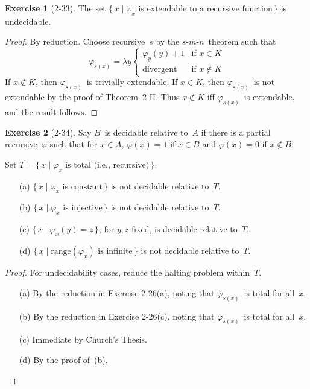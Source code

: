 \documentclass[letterpaper]{article}
\newcommand{\ran}{\mathrm{range}}
\newcommand{\smn}{$s$-$m$-$n$}
\theoremstyle{definition}
\newtheorem*{exer}{Exercise}
\theoremstyle{remark}
\theoremstyle{direction}
\begin{document}
\begin{exer}[2-33]
The set $\{\,x\mid\varphi_x\text{ is extendable to a recursive function}\,\}$ is undecidable.
\end{exer}
\begin{proof}
By reduction. Choose recursive~$s$ by the \smn\ theorem such that
$$\varphi_{s(x)}=\lambda y\begin{cases}
\varphi_y(y)+1&\text{if }x\in K\\
\text{divergent}&\text{if }x\not\in K
\end{cases}$$
If $x\not\in K$, then $\varphi_{s(x)}$~is trivially extendable. If $x\in K$, then $\varphi_{s(x)}$~is not extendable by the proof of Theorem~2-II. Thus $x\not\in K$ iff $\varphi_{s(x)}$~is extendable, and the result follows.
\end{proof}

\begin{exer}[2-34]
Say $B$~is decidable relative to~$A$ if there is a partial recursive~$\varphi$ such that for $x\in A$, $\varphi(x)=1$ if $x\in B$ and $\varphi(x)=0$ if $x\not\in B$.

Set $T=\{\,x\mid\varphi_x\text{ is total (i.e., recursive)}\,\}$.
\begin{enumerate}[itemsep=0pt]
\item[(a)] $\{\,x\mid\varphi_x\text{ is constant}\,\}$ is not decidable relative to~$T$.
\item[(b)] $\{\,x\mid\varphi_x\text{ is injective}\,\}$ is not decidable relative to~$T$.
\item[(c)] $\{\,x\mid\varphi_x(y)=z\,\}$, for $y,z$ fixed, is decidable relative to~$T$.
\item[(d)] $\{\,x\mid\ran(\varphi_x)\text{ is infinite}\,\}$ is not decidable relative to~$T$.
\end{enumerate}
\end{exer}
\begin{proof}
For undecidability cases, reduce the halting problem within~$T$.
\begin{enumerate}[itemsep=0pt]
\item[(a)] By the reduction in Exercise 2-26(a), noting that $\varphi_{s(x)}$~is total for all~$x$.
\item[(b)] By the reduction in Exercise 2-26(c), noting that $\varphi_{s(x)}$~is total for all~$x$.
\item[(c)] Immediate by Church's Thesis.
\item[(d)] By the proof of~(b).\qedhere
\end{enumerate}
\end{proof}
\end{document}
